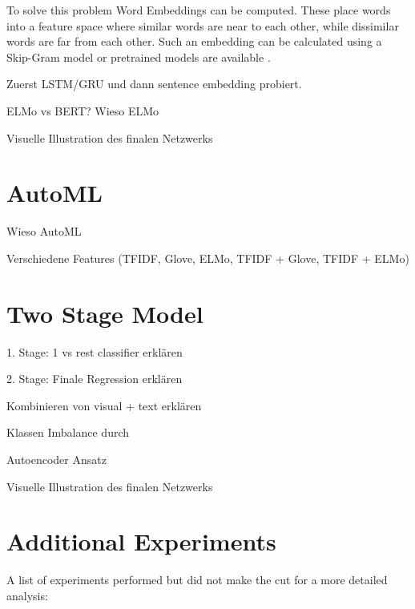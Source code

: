 \documentclass[draft,final,oneside]{vutinfth} %
\begin{document}
To solve this problem Word Embeddings can be computed. These place words into a feature space where similar words are near to each other, while dissimilar words are far from each other. Such an embedding can be calculated using a Skip-Gram model \cite{wordembedding} or pretrained models are available \cite{pennington2014glove}.
\fi

Zuerst LSTM/GRU und dann sentence embedding probiert.

ELMo vs BERT? Wieso ELMo

Visuelle Illustration des finalen Netzwerks

\section{AutoML}
Wieso AutoML

Verschiedene Features (TFIDF, Glove, ELMo, TFIDF + Glove, TFIDF + ELMo)

\section{Two Stage Model}

1. Stage: 1 vs rest classifier erklären

2. Stage: Finale Regression erklären

Kombinieren von visual + text erklären

Klassen Imbalance durch 

Autoencoder Ansatz

Visuelle Illustration des finalen Netzwerks

\section{Additional Experiments}
A list of experiments performed but did not make the cut for a more detailed analysis:
\end{document}
